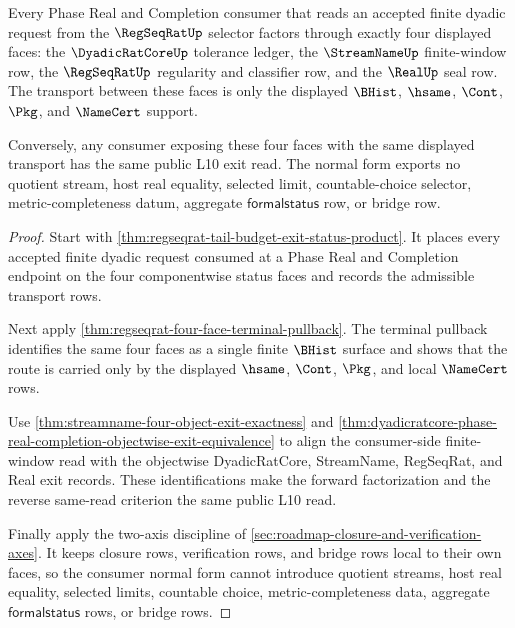 \begin{theorem}
\label{thm:regseqrat-four-face-exit-consumer-normal-form}
Every Phase Real and Completion consumer that reads an accepted finite dyadic request from the $\RegSeqRatUp$ selector factors through exactly four displayed faces: the $\DyadicRatCoreUp$ tolerance ledger, the $\StreamNameUp$ finite-window row, the $\RegSeqRatUp$ regularity and classifier row, and the $\RealUp$ seal row. The transport between these faces is only the displayed $\BHist$, $\hsame$, $\Cont$, $\Pkg$, and $\NameCert$ support.

Conversely, any consumer exposing these four faces with the same displayed transport has the same public L10 exit read. The normal form exports no quotient stream, host real equality, selected limit, countable-choice selector, metric-completeness datum, aggregate $\mathsf{formalstatus}$ row, or bridge row.
\end{theorem}
\begin{proof}
Start with \autoref{thm:regseqrat-tail-budget-exit-status-product}. It places every accepted finite dyadic request consumed at a Phase Real and Completion endpoint on the four componentwise status faces and records the admissible transport rows.

Next apply \autoref{thm:regseqrat-four-face-terminal-pullback}. The terminal pullback identifies the same four faces as a single finite $\BHist$ surface and shows that the route is carried only by the displayed $\hsame$, $\Cont$, $\Pkg$, and local $\NameCert$ rows.

Use \autoref{thm:streamname-four-object-exit-exactness} and \autoref{thm:dyadicratcore-phase-real-completion-objectwise-exit-equivalence} to align the consumer-side finite-window read with the objectwise DyadicRatCore, StreamName, RegSeqRat, and Real exit records. These identifications make the forward factorization and the reverse same-read criterion the same public L10 read.

Finally apply the two-axis discipline of \autoref{sec:roadmap-closure-and-verification-axes}. It keeps closure rows, verification rows, and bridge rows local to their own faces, so the consumer normal form cannot introduce quotient streams, host real equality, selected limits, countable choice, metric-completeness data, aggregate $\mathsf{formalstatus}$ rows, or bridge rows.
\end{proof}

